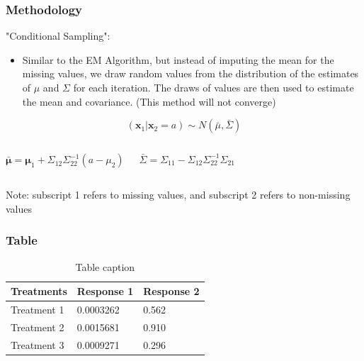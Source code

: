 \documentclass{beamer}
\begin{document}
\begin{frame}
\frametitle{Methodology}
"Conditional Sampling":
\begin{itemize}
\item Similar to the EM Algorithm, but instead of imputing the mean for the missing values, we draw random values from the distribution of the estimates of $\mu$ and $\Sigma$ for each iteration. The draws of values are then used to estimate the mean and covariance. (This method will not converge)


\end{itemize}
\medskip
\begin{equation*}
(\mathbf{x}_1 | \mathbf{x}_2=a) \sim N(\bar{\mu},\bar{\Sigma})
\end{equation*}

\begin{columns}[c] %

\begin{equation*}
\mathbf{\bar{\mu}} = \mathbf{\mu}_1 + \Sigma_{12}\Sigma_{22}^{-1}(a-\mu_{2})
\end{equation*}

\begin{equation*}
\bar{\Sigma} = \Sigma_{11} - \Sigma_{12}\Sigma_{22}^{-1}\Sigma_{21}
\end{equation*}

\end{columns}
\medskip
\medskip
\tiny{Note: subscript 1 refers to missing values, and subscript 2 refers to non-missing values}

\end{frame}




\begin{frame}
\frametitle{Table}
\begin{table}
\begin{tabular}{l l l}
\toprule
\textbf{Treatments} & \textbf{Response 1} & \textbf{Response 2}\\
\midrule
Treatment 1 & 0.0003262 & 0.562 \\
Treatment 2 & 0.0015681 & 0.910 \\
Treatment 3 & 0.0009271 & 0.296 \\
\bottomrule
\end{tabular}
\caption{Table caption}
\end{table}
\end{frame}
\end{document}
